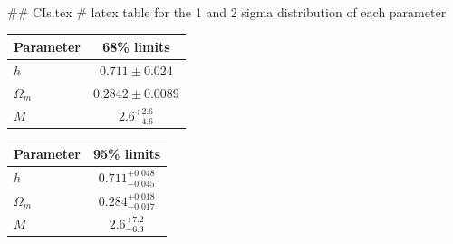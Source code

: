 ## CIs.tex
# latex table for the 1 and 2 sigma distribution of each parameter

\begin{tabular} { l  c}
 Parameter &  68\% limits\\
\hline
{\boldmath$h              $} & $0.711\pm 0.024            $\\
{\boldmath$\Omega_m       $} & $0.2842\pm 0.0089          $\\
{\boldmath$M              $} & $2.6^{+2.6}_{-4.6}         $\\
\hline
\end{tabular}

\begin{tabular} { l  c}
 Parameter &  95\% limits\\
\hline
{\boldmath$h              $} & $0.711^{+0.048}_{-0.045}   $\\
{\boldmath$\Omega_m       $} & $0.284^{+0.018}_{-0.017}   $\\
{\boldmath$M              $} & $2.6^{+7.2}_{-6.3}         $\\
\hline
\end{tabular}
